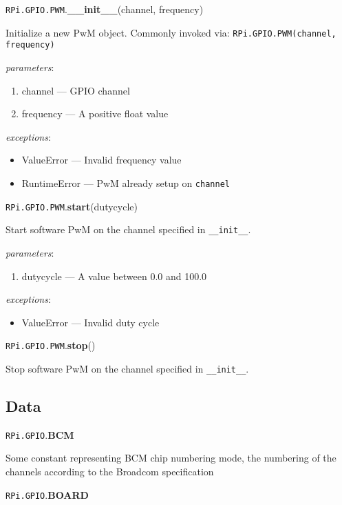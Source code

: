 \documentclass[12pt]{article}
\begin{document}
\noindent \texttt{RPi.GPIO.PWM}.\textbf{\_\_init\_\_}(channel, frequency)
        
Initialize a new PwM object. Commonly invoked via: \texttt{RPi.GPIO.PWM(channel, frequency)}

\textit{parameters}:
\begin{enumerate}
        \item channel --- GPIO channel
        \item frequency --- A positive float value
\end{enumerate}
 
 
\textit{exceptions}:
\begin{itemize}
    \item ValueError --- Invalid frequency value
    \item RuntimeError --- PwM already setup on \texttt{channel}
\end{itemize}

\noindent \texttt{RPi.GPIO.PWM}.\textbf{start}(dutycycle)
        
Start software PwM on the channel specified in \texttt{\_\_init\_\_}.

\textit{parameters}:
\begin{enumerate}      
        \item dutycycle --- A value between 0.0 and 100.0
\end{enumerate}
 
 
\textit{exceptions}:
\begin{itemize}
    \item ValueError --- Invalid duty cycle
\end{itemize}

\noindent \texttt{RPi.GPIO.PWM}.\textbf{stop}()
        
Stop software PwM on the channel specified in \texttt{\_\_init\_\_}.

\medskip \medskip

\subsection{Data}

\noindent \texttt{RPi.GPIO}.\textbf{BCM}

Some constant representing BCM chip numbering mode, the numbering of the channels according to the Broadcom specification

\noindent \texttt{RPi.GPIO}.\textbf{BOARD}
\end{document}
